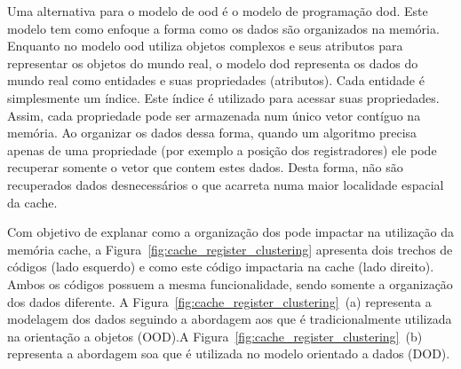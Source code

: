 Uma alternativa para o modelo de \ac{ood} é o modelo de programação \ac{dod}. Este modelo tem como enfoque a forma como os dados são organizados na memória.
Enquanto no modelo \ac{ood} utiliza objetos complexos e seus atributos para representar os objetos do mundo real, o modelo \ac{dod} representa os dados do mundo real como entidades e suas propriedades (atributos).
Cada entidade é simplesmente um índice. Este índice é utilizado para acessar suas propriedades.
Assim, cada propriedade pode ser armazenada num único vetor contíguo na memória.
Ao organizar os dados dessa forma, quando um algoritmo precisa apenas de uma propriedade (por exemplo a posição dos registradores) ele pode recuperar somente o vetor que contem estes dados.
Desta forma, não são recuperados dados desnecessários o que acarreta numa maior localidade espacial da cache.


Com objetivo de explanar como a organização dos pode impactar na utilização da memória cache, a Figura~\ref{fig:cache_register_clustering} apresenta dois trechos de códigos (lado esquerdo) e como este código impactaria na cache (lado direito). Ambos os códigos possuem a mesma funcionalidade, sendo somente a organização dos dados diferente. A Figura~\ref{fig:cache_register_clustering}~(a) representa a modelagem dos dados seguindo a abordagem \ac{aos} que é tradicionalmente utilizada na orientação a objetos (OOD).A Figura~\ref{fig:cache_register_clustering}~(b) representa a abordagem \ac{soa} que é utilizada no modelo orientado a dados (DOD).

